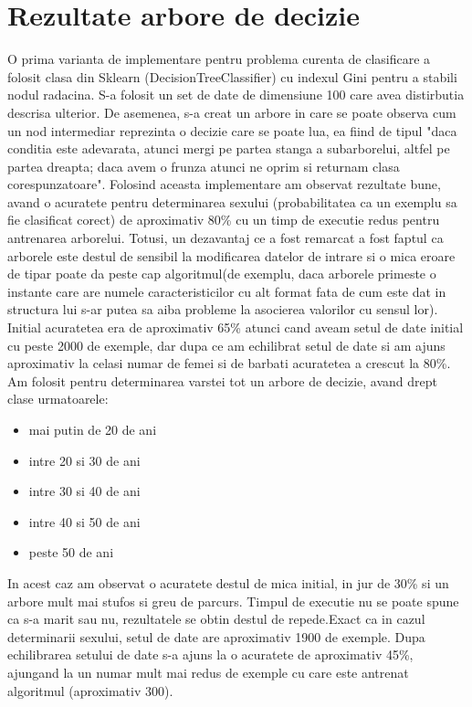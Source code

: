\documentclass[runningheads,a4paper,11pt]{report}
\begin{document}
\section{Rezultate arbore de decizie}
\label{arboreDecizie}
O prima varianta de implementare pentru problema curenta de clasificare a folosit clasa din Sklearn (DecisionTreeClassifier) cu indexul Gini pentru a stabili nodul radacina. S-a folosit un set de date de dimensiune 100 care avea distirbutia descrisa ulterior. De asemenea, s-a creat un arbore in care se poate observa cum un nod intermediar reprezinta o decizie care se poate lua, ea fiind de tipul "daca conditia este adevarata, atunci mergi pe partea stanga a subarborelui, altfel pe partea dreapta; daca avem o frunza atunci ne oprim si returnam clasa corespunzatoare". \newline \newline
Folosind aceasta implementare am observat rezultate bune, avand o acuratete pentru determinarea sexului (probabilitatea ca un exemplu sa fie clasificat corect) de aproximativ 80\% cu un timp de executie redus pentru antrenarea arborelui. Totusi, un dezavantaj ce a fost remarcat a fost faptul ca arborele este destul de sensibil la modificarea datelor de intrare si o mica eroare de tipar poate da peste cap algoritmul(de exemplu, daca arborele primeste o instante care are numele caracteristicilor cu alt format fata de cum este dat in structura lui s-ar putea sa aiba probleme la asocierea valorilor cu sensul lor). \newline 
Initial acuratetea era de aproximativ 65\% atunci cand aveam setul de date initial cu peste 2000 de exemple, dar dupa ce am echilibrat setul de date si am ajuns aproximativ la celasi numar de femei si de barbati acuratetea a crescut la 80\%. \newline \newline
Am folosit pentru determinarea varstei tot un arbore de decizie, avand drept clase urmatoarele:
\begin{itemize}
  \item mai putin de 20 de ani
  \item intre 20 si 30 de ani
  \item intre 30 si 40 de ani
  \item intre 40 si 50 de ani
  \item peste 50 de ani
\end{itemize}
In acest caz am observat o acuratete destul de mica initial, in jur de 30\% si un arbore mult mai stufos si greu de parcurs. Timpul de executie nu se poate spune ca s-a marit sau nu, rezultatele se obtin destul de repede.Exact ca in cazul determinarii sexului, setul de date are aproximativ 1900 de exemple.\newline
Dupa echilibrarea setului de date s-a ajuns la o acuratete de aproximativ 45\%, ajungand la un numar mult mai redus de exemple cu care este antrenat algoritmul (aproximativ 300). \newline \newline
\end{document}
